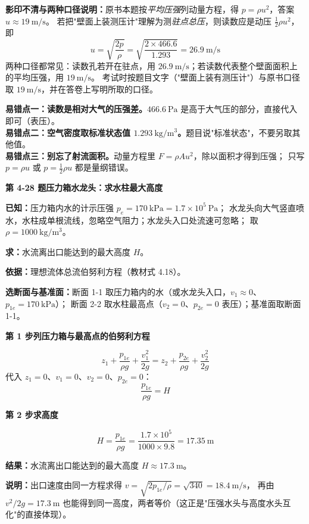 \begin{tishi}
\textbf{影印不清与两种口径说明：}原书本题按\emph{平均压强}列动量方程，得 $p=\rho u^2$，答案 $u\approx19\ \mathrm{m/s}$。
若把"壁面上装测压计"理解为测\emph{驻点总压}，则读数应是动压 $\frac{1}{2}\rho u^2$，即
\[ u=\sqrt{\frac{2p}{\rho}}=\sqrt{\frac{2\times466.6}{1.293}}=26.9\ \mathrm{m/s} \]
两种口径都常见：读数孔若开在驻点，用 $26.9\ \mathrm{m/s}$；若读数代表整个壁面面积上的平均压强，用 $19\ \mathrm{m/s}$。
考试时按题目文字（"壁面上装有测压计"）与原书口径取 $19\ \mathrm{m/s}$，并在答卷上写明所取的口径。
\end{tishi}

\begin{yicuo}
\textbf{易错点一：读数是相对大气的压强差。}$466.6\ \mathrm{Pa}$ 是高于大气压的部分，直接代入即可（表压）。\\
\textbf{易错点二：空气密度取标准状态值 $1.293\ \mathrm{kg/m^3}$。}题目说"标准状态"，不要另取其他值。\\
\textbf{易错点三：别忘了射流面积。}动量方程里 $F=\rho Au^2$，除以面积才得到压强；
只写 $p=\rho u$ 或 $p=\frac{1}{2}\rho u$ 都是量纲错误。
\end{yicuo}

\noindent\textbf{第 4-28 题\quad 压力箱水龙头：求水柱最大高度}

\begin{jie}
\textbf{已知：}压力箱内水的计示压强 $p_e=170\ \mathrm{kPa}=1.7\times10^5\ \mathrm{Pa}$；
水龙头向大气竖直喷水，水柱成单根流线，忽略空气阻力；水龙头入口处流速可忽略；
取 $\rho=1000\ \mathrm{kg/m^3}$。

\textbf{求：}水流离出口能达到的最大高度 $H$。

\textbf{依据：}理想流体总流伯努利方程（教材式 4.18）。

\textbf{选断面与基准面：}断面 1-1 取压力箱内的水（或水龙头入口，$v_1\approx0$、$p_{1e}=170\ \mathrm{kPa}$）；
断面 2-2 取水柱最高点（$v_2=0$、$p_{2e}=0$ 表压）；基准面取断面 1-1。

\textbf{第 1 步\quad 列压力箱与最高点的伯努利方程}

\[ z_1+\frac{p_{1e}}{\rho g}+\frac{v_1^2}{2g}=z_2+\frac{p_{2e}}{\rho g}+\frac{v_2^2}{2g} \]
代入 $z_1=0$、$v_1=0$、$v_2=0$、$p_{2e}=0$：
\[ \frac{p_{1e}}{\rho g}=H \]

\textbf{第 2 步\quad 求高度}

\[ H=\frac{p_{1e}}{\rho g}=\frac{1.7\times10^5}{1000\times9.8}=17.35\ \mathrm{m} \]

\textbf{结果：}水流离出口能达到的最大高度 $H\approx17.3\ \mathrm{m}$。

\textbf{说明：}出口速度由同一方程求得 $v=\sqrt{2p_{1e}/\rho}=\sqrt{340}=18.4\ \mathrm{m/s}$，
再由 $v^2/2g=17.3\ \mathrm{m}$ 也能得到同一高度，两者等价（这正是"压强水头与高度水头互化"的直接体现）。
\end{jie}

